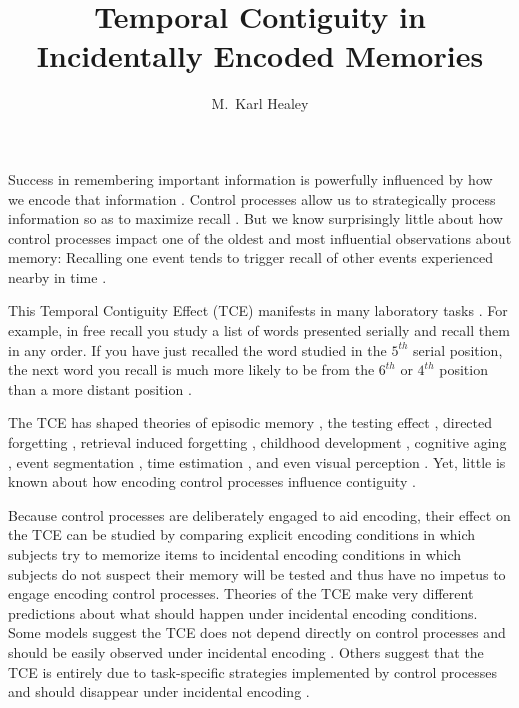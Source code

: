 \documentclass[jou,natbib]{apa6} %
\title{Temporal Contiguity in Incidentally Encoded Memories}
\author{M.\ Karl Healey}
\affiliation{Michigan State University}
\begin{document}
\maketitle

Success in remembering important information is powerfully influenced by how we encode that information \citep{CraiLock72,TulvPear66}. 
Control processes \citep{LehmMalm13,RaaiShif81} allow us to strategically process information so as to maximize recall \citep[e.g.,][]{Unsw16}. But we know surprisingly little about how control processes impact one of the oldest and most influential observations about memory: Recalling one event tends to trigger recall of other events experienced nearby in time \citep{Aris,Bowe72,Kaha96}. 

This Temporal Contiguity Effect (TCE) manifests in many laboratory tasks \citep{Kaha96,DaviEtal08,SchwEtal05}. For example, in free recall you study a list of words presented serially and recall them in any order. If you have just recalled the word studied in the $5^{th}$ serial position, the next word you recall is much more likely to be from the $6^{th}$ or $4^{th}$ position than a more distant position \citep{Kaha96}.

The TCE has shaped theories of episodic memory \citep{LehmMalm13,CortEtal15,LohnEtal14,DaveEtal05,Unsw08}, the testing effect \citep{KarpEtal14}, directed forgetting \citep{SahaEtal13}, retrieval induced forgetting \citep{KlieBaum16}, childhood development \citep{JarroEtal15}, cognitive aging \citep{WahlHuff15,HealKaha15}, event segmentation \citep{EzzyDava14}, time estimation \citep{SahaSmit13}, and even visual perception \citep{TurkEtal12}. Yet, little is known about how encoding control processes influence contiguity \citep{Hint16}. 

Because control processes are deliberately engaged to aid encoding, their effect on the TCE can be studied by comparing explicit encoding conditions in which subjects try to memorize items to incidental encoding conditions in which subjects do not suspect their memory will be tested and thus have no impetus to engage encoding control processes. Theories of the TCE make very different predictions about what should happen under incidental encoding conditions. Some models suggest the TCE does not depend directly on control processes and should be easily observed under incidental encoding \citep{HealEtal14,LohnEtal14}. Others suggest that the TCE is entirely due to task-specific strategies implemented by control processes and should disappear under incidental encoding \citep{Hint16}. %
\end{document}
